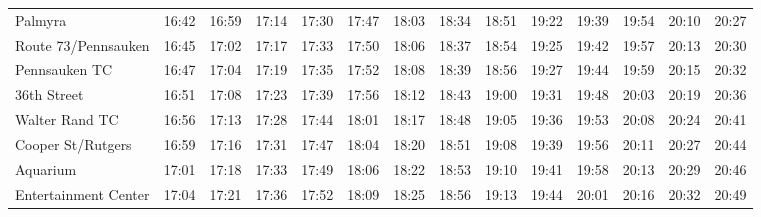 \begin{center}
\begin{tabular}{@{}lrrrrrrrrrrrrr@{}}
Palmyra & 16:42 & 16:59 & 17:14 & 17:30 & 17:47 & 18:03 & 18:34 & 18:51 & 19:22 & 19:39 & 19:54 & 20:10 & 20:27 \\
Route 73/Pennsauken & 16:45 & 17:02 & 17:17 & 17:33 & 17:50 & 18:06 & 18:37 & 18:54 & 19:25 & 19:42 & 19:57 & 20:13 & 20:30 \\
Pennsauken TC & 16:47 & 17:04 & 17:19 & 17:35 & 17:52 & 18:08 & 18:39 & 18:56 & 19:27 & 19:44 & 19:59 & 20:15 & 20:32 \\
36th Street & 16:51 & 17:08 & 17:23 & 17:39 & 17:56 & 18:12 & 18:43 & 19:00 & 19:31 & 19:48 & 20:03 & 20:19 & 20:36 \\
Walter Rand TC & 16:56 & 17:13 & 17:28 & 17:44 & 18:01 & 18:17 & 18:48 & 19:05 & 19:36 & 19:53 & 20:08 & 20:24 & 20:41 \\
Cooper St/Rutgers & 16:59 & 17:16 & 17:31 & 17:47 & 18:04 & 18:20 & 18:51 & 19:08 & 19:39 & 19:56 & 20:11 & 20:27 & 20:44 \\
Aquarium & 17:01 & 17:18 & 17:33 & 17:49 & 18:06 & 18:22 & 18:53 & 19:10 & 19:41 & 19:58 & 20:13 & 20:29 & 20:46 \\
Entertainment Center & 17:04 & 17:21 & 17:36 & 17:52 & 18:09 & 18:25 & 18:56 & 19:13 & 19:44 & 20:01 & 20:16 & 20:32 & 20:49 \\
\bottomrule\end{tabular}\end{center}
